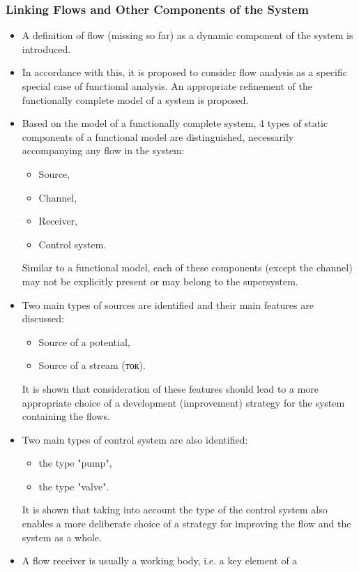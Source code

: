 \documentclass[a4paper,11pt]{article}
\begin{document}
\subsubsection{Linking Flows and Other Components of the System}
\begin{itemize}
\item A definition of flow (missing so far) as a dynamic component of the
  system is introduced.
\item In accordance with this, it is proposed to consider flow analysis as a
  specific special case of functional analysis. An appropriate refinement of
  the functionally complete model of a system is proposed.
\item Based on the model of a functionally complete system, 4 types of static
  components of a functional model are distinguished, necessarily accompanying
  any flow in the system:
  \begin{itemize}
  \item Source,
  \item Channel,
  \item Receiver,
  \item Control system.
  \end{itemize}
  Similar to a functional model, each of these components (except the channel)
  may not be explicitly present or may belong to the supersystem.
\item Two main types of sources are identified and their main features are
  discussed:
  \begin{itemize}
  \item Source of a potential,
  \item Source of a stream (\foreignlanguage{russian}{ток}).
  \end{itemize}
  It is shown that consideration of these features should lead to a more
  appropriate choice of a development (improvement) strategy for the system
  containing the flows.
\item Two main types of control system are also identified:
  \begin{itemize}
  \item the type "pump",
  \item the type "valve".
  \end{itemize}
  It is shown that taking into account the type of the control system also
  enables a more deliberate choice of a strategy for improving the flow and
  the system as a whole.
\item A flow receiver is usually a working body, i.e. a key element of a

\end{itemize}
\end{document}
